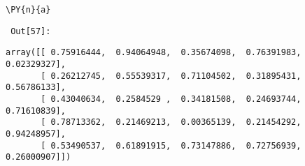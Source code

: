 {\par%
\vspace{-1\baselineskip}%
}%
\begin{notebookcell}[57]%
\begin{addmargin}[\cellleftmargin]{0em}%
{\smaller%
\par%
%
\vspace{-1\smallerfontscale}%
\begin{Verbatim}[commandchars=\\\{\}]
\PY{n}{a}
\end{Verbatim}
%
\par%
\vspace{-1\smallerfontscale}}%
\end{addmargin}
\end{notebookcell}

\par\vspace{1\smallerfontscale}%
    
        {\par%
        \vspace{-1\smallerfontscale}%
        \noindent%
        \begin{minipage}{\cellleftmargin}%
    \hfill%
    {\smaller%
    \tt%
    \color{nbframe-out-prompt}%
    Out[57]:}%
    \hspace{\inputpadding}%
    \hspace{0em}%
    \hspace{3pt}%
    \end{minipage}%
        }%
    \begin{addmargin}[\cellleftmargin]{0em}%
    {\smaller%
    \vspace{-1\smallerfontscale}%
    
    
    
    \begin{verbatim}
array([[ 0.75916444,  0.94064948,  0.35674098,  0.76391983,  0.02329327],
       [ 0.26212745,  0.55539317,  0.71104502,  0.31895431,  0.56786133],
       [ 0.43040634,  0.2584529 ,  0.34181508,  0.24693744,  0.71610839],
       [ 0.78713362,  0.21469213,  0.00365139,  0.21454292,  0.94248957],
       [ 0.53490537,  0.61891915,  0.73147886,  0.72756939,  0.26000907]])
    \end{verbatim}

    
}%
    \end{addmargin}%

